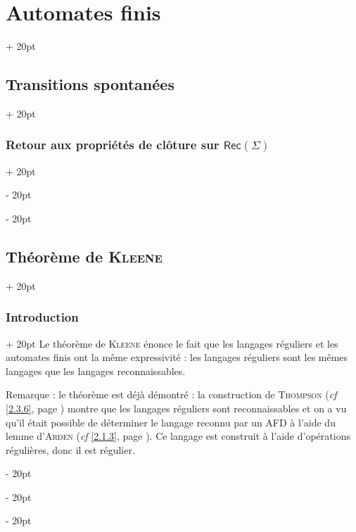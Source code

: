 \documentclass[a4paper, 12pt, twoside]{article}
\newcommand{\lr}[1]{\left( #1 \right)}
\newcommand{\ind}[1][20pt]{\advance\leftskip + #1}
\newcommand{\deind}[1][20pt]{\advance\leftskip - #1}
\newenvironment{indt}[2][20pt]{#2 \par \ind[#1]}{\par \deind} %
\newcommand{\Rec}[1]{\mathsf{Rec}\!\lr{#1}}
\begin{document}
\begin{indt}{\section{Automates finis}}
\begin{indt}{\subsection{Transitions spontanées}}
\begin{indt}{\subsubsection{Retour aux propriétés de clôture sur $\Rec \Sigma$}}
\begin{center}
                \end{center}
            \end{indt}
        \end{indt}

        \vspace{12pt}
        
        \begin{indt}{\subsection{Théorème de \textsc{Kleene}}}
            \label{2.4}

            \begin{indt}{\subsubsection{Introduction}}
                Le théorème de \textsc{Kleene} énonce le fait que les langages réguliers et les automates finis ont la même expressivité : les langages réguliers sont les mêmes langages que les langages reconnaissables.

                \vspace{12pt}
                
                Remarque : le théorème est déjà démontré : la construction de \textsc{Thompson} (\textit{cf} \ref{2.3.6}, page \pageref{2.3.6}) montre que les langages réguliers sont reconnaissables et on a vu qu'il était possible de déterminer le langage reconnu par un AFD à l'aide du lemme d'\textsc{Arden} (\textit{cf} \ref{2.1.3}, page \pageref{2.1.3}).
                Ce langage est construit à l'aide d'opérations régulières, donc il est régulier.


\end{indt}
\end{indt}
\end{indt}
\end{document}
